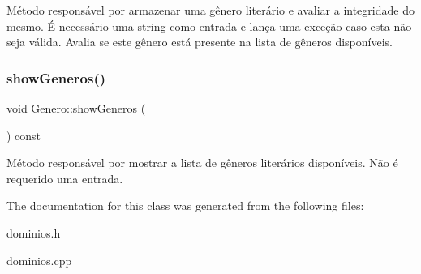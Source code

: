 Método responsável por armazenar uma gênero literário e avaliar a integridade do mesmo. É necessário uma string como entrada e lança uma exceção caso esta não seja válida. Avalia se este gênero está presente na lista de gêneros disponíveis. \mbox{\label{classGenero_a1f7c047f6d2c5b75520673a5c3cca6a6}} 
\subsubsection{\texorpdfstring{show\+Generos()}{showGeneros()}}
{\footnotesize\ttfamily void Genero\+::show\+Generos (\begin{DoxyParamCaption}{ }\end{DoxyParamCaption}) const}

Método responsável por mostrar a lista de gêneros literários disponíveis. Não é requerido uma entrada. 

The documentation for this class was generated from the following files\+:\begin{DoxyCompactItemize}
\item 
dominios.\+h\item 
dominios.\+cpp\end{DoxyCompactItemize}
